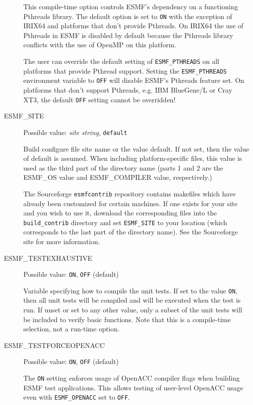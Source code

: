 \begin{description}
This compile-time option controls ESMF's dependency on a functioning
Pthreads library. The default option is set to {\tt ON} with the exception
of IRIX64 and platforms that don't provide Pthreads. On IRIX64 the use of
Pthreads in ESMF is disabled by default because the Pthreads library conflicts
with the use of OpenMP on this platform.

The user can override the default setting of {\tt ESMF\_PTHREADS} on all
platforms that provide Pthread support. Setting the {\tt ESMF\_PTHREADS}
environment variable to {\tt OFF} will disable ESMF's Pthreads feature set.
On platforms that don't support Pthreads, e.g. IBM BlueGene/L or Cray XT3, the
default {\tt OFF} setting cannot be overridden!
 
\item[ESMF\_SITE]
Possible value: {\em site string}, {\tt default}

Build configure file site name or the value default. If not set, then the value
of default is assumed. When including platform-specific files, this value is 
used as the third part of the directory name (parts 1 and 2 are the
ESMF\_OS value and ESMF\_COMPILER value, respectively.)

The Sourceforge {\tt esmfcontrib} repository contains makefiles which have 
already been customized for certain machines.  If one exists for your site 
and you wish to use it, download the corresponding files into the 
{\tt build\_contrib} directory and set {\tt ESMF\_SITE} to your location
(which corresponds to the last part of the directory name).  See the 
Sourceforge site 
 for more information.

\item[ESMF\_TESTEXHAUSTIVE] 
Possible value: {\tt ON}, {\tt OFF} (default)

Variable specifying how to compile the unit tests. If set to the value {\tt ON},
then all unit tests will be compiled and will be executed when the test is
run.  If unset or set to any other value, only a subset of the unit tests
will be included to verify basic functions. Note that this is a compile-time
selection, not a run-time option.

\item[ESMF\_TESTFORCEOPENACC] 
Possible value: {\tt ON}, {\tt OFF} (default)

The {\tt ON} setting enforces usage of OpenACC compiler flags when building ESMF test applications. This allows testing of user-level OpenACC usage even with {\tt ESMF\_OPENACC} set to {\tt OFF}.


\end{description}
